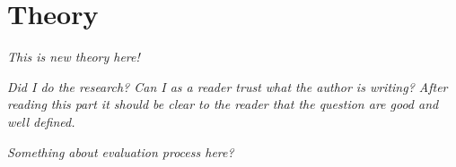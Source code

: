 \chapter{Theory}\label{cha:theory}

\textit{This is new theory here!}

\textit{Did I do the research? Can I as a reader trust what the author is writing? After reading this part it should be clear to the reader that the question are good and well defined.}

\textit{Something about evaluation process here?}
